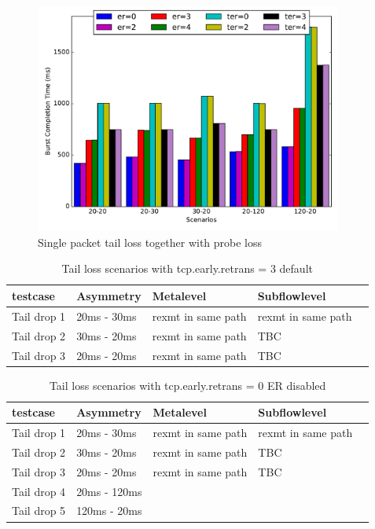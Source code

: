 \documentclass[12pt,draftcls,onecolumn]{IEEEtran}
\begin{document}
\begin{figure}[!ht]
\begin{center}
\includegraphics[angle=0, width=0.9\textwidth, natwidth=578.16,natheight=433.62]{plots/T1PP.pdf}
\caption{Single packet tail loss together with probe loss}\label{t1pp}
\end{center}
\end{figure}








\begin{table}[!ht]
\centering
\caption{Tail loss scenarios with tcp.early.retrans = 3 default}
\label{ret3}
\begin{tabular}{|l|l|l|l|l|}
\hline
 testcase   & Asymmetry   & Metalevel          & Subflowlevel       &  \\\hline
Tail drop 1 & 20ms - 30ms & rexmt in same path & rexmt in same path &  \\\hline
Tail drop 2 & 30ms - 20ms & rexmt in same path & TBC                &  \\\hline
Tail drop 3 & 20ms - 20ms & rexmt in same path & TBC                &  \\ \hline
\end{tabular}
\end{table}





\begin{table}[!ht]
\centering
\caption{Tail loss scenarios with tcp.early.retrans = 0 ER disabled}
\label{ret0}
\begin{tabular}{|l|l|l|l|l|}
\hline
 testcase   & Asymmetry   & Metalevel          & Subflowlevel       &  \\\hline
Tail drop 1 & 20ms - 30ms & rexmt in same path & rexmt in same path &  \\\hline
Tail drop 2 & 30ms - 20ms & rexmt in same path & TBC                &  \\\hline
Tail drop 3 & 20ms - 20ms & rexmt in same path & TBC                & \\ \hline
Tail drop 4 & 20ms - 120ms &  			&		&  \\ \hline
Tail drop 5 & 120ms - 20ms &  			& 		& \\ \hline 
\end{tabular}
\end{table}
\end{document}
